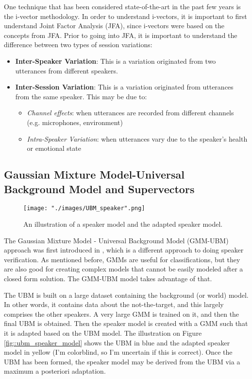 One technique that has been considered state-of-the-art in the past few years is the i-vector methodology. In order to understand i-vectors, it is important to first understand Joint Factor Analysis (JFA), since i-vectors were based on the concepts from JFA. Prior to going into JFA, it is important to understand the difference between two types of session variations:
\begin{itemize}
    \item \textbf{Inter-Speaker Variation}: This is a variation originated from two utterances from different speakers.
    \item \textbf{Inter-Session Variation}: This is a variation originated from utterances from the same speaker. This may be due to:
    \begin{itemize}
        \item \textit{Channel effects}: when utterances are recorded from different channels (e.g. microphones, environment)
        \item \textit{Intra-Speaker Variation}: when utterances vary due to the speaker's health or emotional state
    \end{itemize}
\end{itemize}

\subsection{Gaussian Mixture Model-Universal Background Model and Supervectors}

\begin{figure}[ht]
\begin{center}
    \texttt{[image: "./images/UBM\_speaker".png]}
    \caption{An illustration of a speaker model and the adapted speaker model. }
    \label{fig::ubm_graphs}
\end{center}
\end{figure}

The Gaussian Mixture Model - Universal Background Model (GMM-UBM) approach was first introduced in \cite{first_UBM}, which is a different approach to doing speaker verification. As mentioned before, GMMs are useful for classifications, but they are also good for creating complex models that cannot be easily modeled after a closed form solution. The GMM-UBM model takes advantage of that.

The UBM is built on a large dataset containing the background (or world) model. In other words, it contains data about the not-the-target, and this largely comprises the other speakers. A very large GMM is trained on it, and then the final UBM is obtained. Then the speaker model is created with a GMM such that it is adapted based on the UBM model. The illustration on Figure \ref{fig::ubm_speaker_model} shows the UBM in blue and the adapted speaker model in yellow (I'm colorblind, so I'm uncertain if this is correct). Once the UBM has been formed, the speaker model may be derived from the UBM via a maximum a posteriori adaptation.

